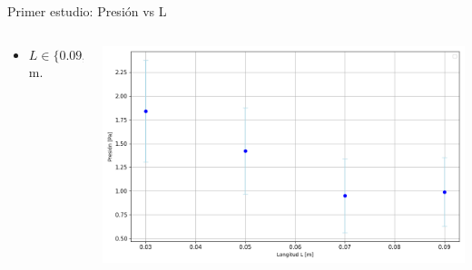 \documentclass{beamer}
\begin{document}
\begin{frame}{Primer estudio: Presión vs L}
  \begin{columns}
    \begin{column}{0.40\textwidth}
      \scriptsize {}
      \begin{itemize}
        \item $L \in \{ \textit{0.09}, \textit{0.007}, \textit{0.05}, \textit{0.03} \}$ m.
      \end{itemize}
    \end{column}
    \begin{column}{0.60\textwidth}
      \includegraphics[width=1\linewidth]{photoMaterial/PvL.png}
    \end{column}
  \end{columns}
\end{frame}
\end{document}
